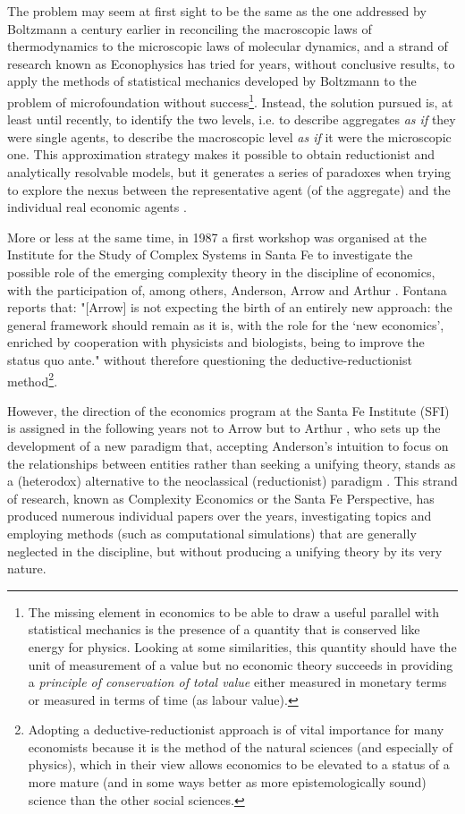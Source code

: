 \documentclass[a4paper, headings=standardclasses]{scrartcl}
\begin{document}
The problem may seem at first sight to be the same as the one addressed by Boltzmann a century earlier in reconciling the macroscopic laws of thermodynamics to the microscopic laws of molecular dynamics, and a strand of research known as Econophysics has tried for years, without conclusive results, to apply the methods of statistical mechanics developed by Boltzmann to the problem of microfoundation without success\footnote{The missing element in economics to be able to draw a useful parallel with statistical mechanics is the presence of a quantity that is conserved like energy for physics. Looking at some similarities, this quantity should have the unit of measurement of a value but no economic theory succeeds in providing a \textit{principle of conservation of total value} either measured in monetary terms or measured in terms of time (as labour value).}.
Instead, the solution pursued is, at least until recently, to identify the two levels, i.e. to describe aggregates \textit{as if} they were single agents, to describe the macroscopic level \textit{as if} it were the microscopic one. This approximation strategy makes it possible to obtain reductionist and analytically resolvable models, but it generates a series of paradoxes when trying to explore the nexus between the representative agent (of the aggregate) and the individual real economic agents \parencite{kirman1992}.

More or less at the same time, in 1987 a first workshop was organised at the Institute for the Study of Complex Systems in Santa Fe to investigate the possible role of the emerging complexity theory in the discipline of economics, with the participation of, among others, Anderson, Arrow and Arthur \parencite{fontana2010a}.
Fontana reports that: "[Arrow] is not expecting the birth of an entirely new approach: the general framework should remain as it is, with the role for the `new economics', enriched by cooperation with physicists and biologists, being to improve the status quo ante." \parencite{fontana2010a} without therefore questioning the deductive-reductionist method\footnote{Adopting a deductive-reductionist approach is of vital importance for many economists because it is the method of the natural sciences (and especially of physics), which in their view allows economics to be elevated to a status of a more mature (and in some ways better as more epistemologically sound) science than the other social sciences.}.

However, the direction of the economics program at the Santa Fe Institute (SFI) is assigned in the following years not to Arrow but to Arthur \parencite{fontana2010a}, who sets up the development of a new paradigm that, accepting Anderson's intuition to focus on the relationships between entities rather than seeking a unifying theory, stands as a (heterodox) alternative to the neoclassical (reductionist) paradigm \parencite{fontana2010,arthur2021}.
This strand of research, known as Complexity Economics or the Santa Fe Perspective, has produced numerous individual papers over the years, investigating topics and employing methods (such as computational simulations) that are generally neglected in the discipline, but without producing a unifying theory by its very nature.
\end{document}
